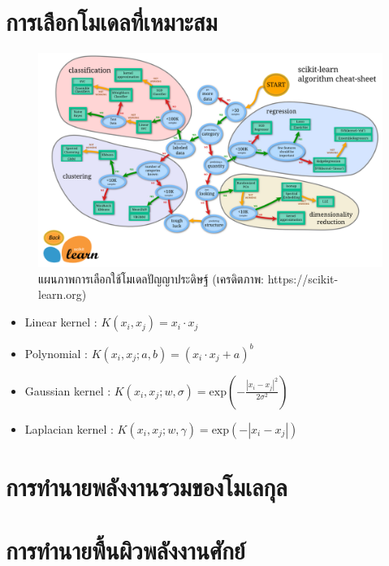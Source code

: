 \section{การเลือกโมเดลที่เหมาะสม}

\begin{figure}[H]
    \centering
    \includegraphics[width=1.3\linewidth,angle=90]{fig/ml_map.png}
    \caption{แผนภาพการเลือกใช้โมเดลปัญญาประดิษฐ์ (เครดิตภาพ: https://scikit-learn.org)}
    \label{fig:ml_map}
\end{figure}

\begin{itemize}
    \item Linear kernel : $K(x_i, x_j) = x_i \cdot x_j$
    \item Polynomial : $K(x_i, x_j; a, b) = (x_i \cdot x_j + a)^b$
    \item Gaussian kernel : $K(x_i, x_j; w, \sigma) = \mathrm{exp}\left(-\frac{|x_i-x_j|^2}{2\sigma^2}\right)$
    \item Laplacian kernel : $K(x_i, x_j; w, \gamma) = \mathrm{exp}\left(-{|x_i-x_j|}\right)$
\end{itemize}

\section{การทำนายพลังงานรวมของโมเลกุล}

\section{การทำนายพื้นผิวพลังงานศักย์}

